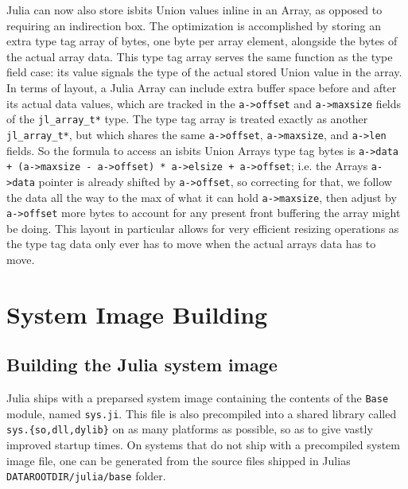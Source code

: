 Julia can now also store {\textquotedbl}isbits Union{\textquotedbl} values inline in an Array, as opposed to requiring an indirection box. The optimization is accomplished by storing an extra {\textquotedbl}type tag array{\textquotedbl} of bytes, one byte per array element, alongside the bytes of the actual array data. This type tag array serves the same function as the type field case: its value signals the type of the actual stored Union value in the array. In terms of layout, a Julia Array can include extra {\textquotedbl}buffer{\textquotedbl} space before and after its actual data values, which are tracked in the \texttt{a->offset} and \texttt{a->maxsize} fields of the \texttt{jl\_array\_t*} type. The {\textquotedbl}type tag array{\textquotedbl} is treated exactly as another \texttt{jl\_array\_t*}, but which shares the same \texttt{a->offset}, \texttt{a->maxsize}, and \texttt{a->len} fields. So the formula to access an isbits Union Array{\textquotesingle}s type tag bytes is \texttt{a->data + (a->maxsize - a->offset) * a->elsize + a->offset}; i.e. the Array{\textquotesingle}s \texttt{a->data} pointer is already shifted by \texttt{a->offset}, so correcting for that, we follow the data all the way to the max of what it can hold \texttt{a->maxsize}, then adjust by \texttt{a->offset} more bytes to account for any present {\textquotedbl}front buffering{\textquotedbl} the array might be doing. This layout in particular allows for very efficient resizing operations as the type tag data only ever has to move when the actual array{\textquotesingle}s data has to move.



\hypertarget{6450179845418792741}{}


\section{System Image Building}



\hypertarget{2889722918811470983}{}


\subsection{Building the Julia system image}



Julia ships with a preparsed system image containing the contents of the \texttt{Base} module, named \texttt{sys.ji}.  This file is also precompiled into a shared library called \texttt{sys.\{so,dll,dylib\}} on as many platforms as possible, so as to give vastly improved startup times.  On systems that do not ship with a precompiled system image file, one can be generated from the source files shipped in Julia{\textquotesingle}s \texttt{DATAROOTDIR/julia/base} folder.



